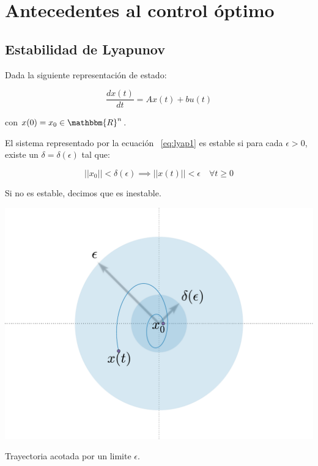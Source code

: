 
\chapter{Antecedentes al control óptimo}


    \section{Estabilidad de Lyapunov}

        Dada la siguiente representación de estado:

        \begin{equation} \label{eq:lyap1}
            \frac{dx(t)}{dt} = A x(t) + b u(t)
        \end{equation}

        con $x(0) = x_0  \in \mathbbm{R}^n$.

        \begin{definicion}
            El sistema representado por la ecuación ~\ref{eq:lyap1} es estable si para cada $\epsilon > 0$, existe un $\delta = \delta(\epsilon)$ tal que:

            \begin{equation*}
                ||x_0|| < \delta(\epsilon) \implies  ||x(t)||  < \epsilon \quad \forall t \ge 0
            \end{equation*}

            Si no es estable, decimos que es inestable.

        \end{definicion}

        \begin{marginfigure}
            \centering
            \includegraphics[width=\textwidth]{./imagenes/trayectoriaacotada.pdf}
            \caption{\label{fig:trayectoriaestable}Trayectoria acotada por un limite $\epsilon$.}
        \end{marginfigure}

